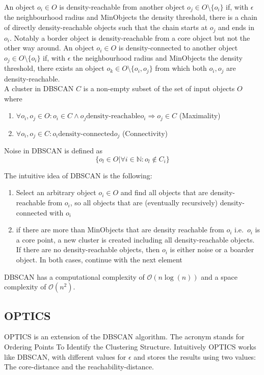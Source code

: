 \noindent An object $o_i \in O$ is density-reachable from another object $o_j \in O\setminus \{o_i\}$ if, with $\epsilon$ the neighbourhood radius and MinObjects the density threshold, there is a chain of directly density-reachable objects such that the chain starts at $o_j$ and ends in $o_i$. 
Notably a border object is density-reachable from a core object but not the other way around. 
An object $o_i \in O$ is density-connected to another object $o_j \in O\setminus \{o_i\}$ if, with $\epsilon$ the neighbourhood radius and MinObjects the density threshold, there exists an object $o_k \in O\setminus \{o_i, o_j\}$ from which both $o_i, o_j$ are density-reachable. \\

\noindent A cluster in DBSCAN $C$ is a non-empty subset of the set of input objects $O$ where 
\begin{enumerate}
    \item $\forall o_i, o_j \in O: o_i \in C \wedge o_j \text{density-reachable} o_i \Rightarrow o_j \in C$ (Maximality)
    \item $\forall o_i, o_j \in C: o_i \text{density-connected} o_j$ (Connectivity)
\end{enumerate}

\noindent Noise in DBSCAN is defined as \[ \{o_l \in O | \forall i \in \mathbb{N}: o_l \not \in C_i \}\]

\noindent The intuitive idea of DBSCAN is the following:
\begin{enumerate}
    \item Select an arbitrary object $o_i \in O$ and find all objects that are density-reachable from $o_i$, so all objects that are (eventually recursively) density-connected with $o_i$
    \item if there are more than MinObjects that are density reachable from $o_i$ i.e.~$o_i$ is a core point, a new cluster is created including all density-reachable objects. If there are no density-reachable objects, then $o_i$ is either noise or a boarder object. In both cases, continue with the next element
\end{enumerate}
\noindent DBSCAN has a computational complexity of $\mathcal{O}(n \log(n))$ and a space complexity of $\mathcal{O}(n^2)$.


\subsection{OPTICS}\label{\positionnumber}
OPTICS is an extension of the DBSCAN algorithm. The acronym stands for Ordering Points To Identify the Clustering Structure. Intuitively OPTICS works like DBSCAN, with different values for $\epsilon$ and stores the results using two values: The core-distance and the reachability-distance. \\

